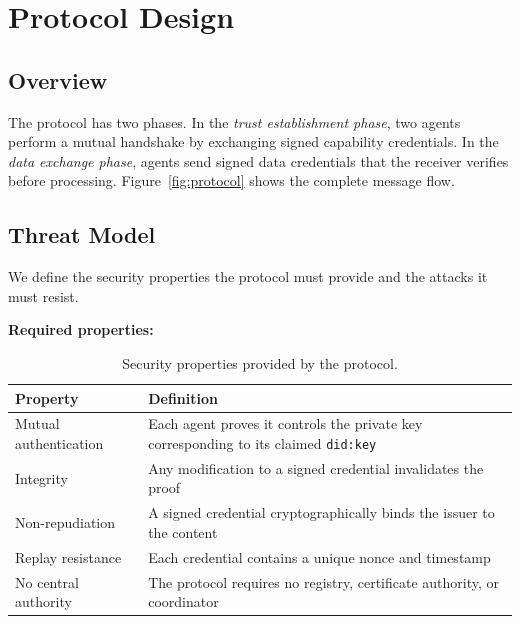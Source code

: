 \documentclass[11pt]{article}
\newcommand{\didkey}{\texttt{did:key}}
\begin{document}
\section{Protocol Design}
\label{sec:protocol}

\subsection{Overview}

The protocol has two phases. In the \emph{trust establishment phase}, two agents perform a mutual handshake by exchanging signed capability credentials. In the \emph{data exchange phase}, agents send signed data credentials that the receiver verifies before processing. Figure~\ref{fig:protocol} shows the complete message flow.

\subsection{Threat Model}
\label{sec:threat}

We define the security properties the protocol must provide and the attacks it must resist.

\medskip
\noindent\textbf{Required properties:}

\begin{table}[h]
\centering
\caption{Security properties provided by the protocol.}
\label{tab:properties}
\begin{tabular}{@{}lp{9.5cm}@{}}
\toprule
\textbf{Property} & \textbf{Definition} \\
\midrule
Mutual authentication & Each agent proves it controls the private key corresponding to its claimed \didkey{} \\
Integrity & Any modification to a signed credential invalidates the proof \\
Non-repudiation & A signed credential cryptographically binds the issuer to the content \\
Replay resistance & Each credential contains a unique nonce and timestamp \\
No central authority & The protocol requires no registry, certificate authority, or coordinator \\
\bottomrule
\end{tabular}
\end{table}
\end{document}
